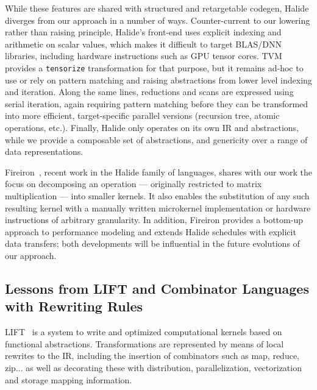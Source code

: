 While these features are shared with structured and retargetable codegen, Halide diverges from our approach in a number of ways.
Counter-current to our lowering rather than raising principle, Halide's front-end uses explicit indexing and arithmetic on scalar values, which makes it difficult to target BLAS/DNN libraries, including hardware instructions such as GPU tensor cores. TVM provides a \lstinline{tensorize} transformation for that purpose, but it remains ad-hoc to use or rely on pattern matching and raising abstractions from lower level indexing and iteration. Along the same lines, reductions and scans are expressed using serial iteration, again requiring pattern matching before they can be transformed into more efficient, target-specific parallel versions (recursion tree, atomic operations, etc.). Finally, Halide only operates on its own IR and abstractions, while we provide a composable set of abstractions, and genericity over a range of data representations.

Fireiron~\cite{Fireiron}, recent work in the Halide family of languages, shares with our work the focus on decomposing an operation --- originally restricted to matrix multiplication --- into smaller kernels. It also enables the substitution of any such resulting kernel with a manually written microkernel implementation or hardware instructions of arbitrary granularity. In addition, Fireiron provides a bottom-up approach to performance modeling and extends Halide schedules with explicit data transfers; both developments will be influential in the future evolutions of our approach.

\subsection{Lessons from LIFT and Combinator Languages with Rewriting Rules}
LIFT~\cite{LIFT} is a system to write and optimized computational kernels based on functional abstractions. 
Transformations are represented by means of local rewrites to the IR, including the insertion of combinators such as map, reduce, zip... as well as decorating these with distribution, parallelization, vectorization and storage mapping information.

